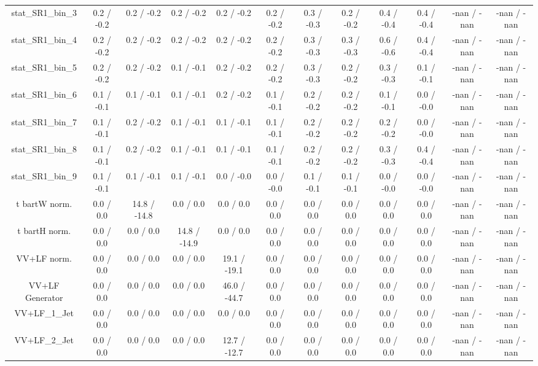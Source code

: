 \begin{table}[htbp]
\begin{center}
\begin{tabular}{|c|c|c|c|c|c|c|c|c|c|c|c|}
 stat_SR1_bin_3 & 0.2 / -0.2 & 0.2 / -0.2 & 0.2 / -0.2 & 0.2 / -0.2 & 0.2 / -0.2 & 0.3 / -0.3 & 0.2 / -0.2 & 0.4 / -0.4 & 0.4 / -0.4 & -nan / -nan & -nan / -nan \\ 
 stat_SR1_bin_4 & 0.2 / -0.2 & 0.2 / -0.2 & 0.2 / -0.2 & 0.2 / -0.2 & 0.2 / -0.2 & 0.3 / -0.3 & 0.3 / -0.3 & 0.6 / -0.6 & 0.4 / -0.4 & -nan / -nan & -nan / -nan \\ 
 stat_SR1_bin_5 & 0.2 / -0.2 & 0.2 / -0.2 & 0.1 / -0.1 & 0.2 / -0.2 & 0.2 / -0.2 & 0.3 / -0.3 & 0.2 / -0.2 & 0.3 / -0.3 & 0.1 / -0.1 & -nan / -nan & -nan / -nan \\ 
 stat_SR1_bin_6 & 0.1 / -0.1 & 0.1 / -0.1 & 0.1 / -0.1 & 0.2 / -0.2 & 0.1 / -0.1 & 0.2 / -0.2 & 0.2 / -0.2 & 0.1 / -0.1 & 0.0 / -0.0 & -nan / -nan & -nan / -nan \\ 
 stat_SR1_bin_7 & 0.1 / -0.1 & 0.2 / -0.2 & 0.1 / -0.1 & 0.1 / -0.1 & 0.1 / -0.1 & 0.2 / -0.2 & 0.2 / -0.2 & 0.2 / -0.2 & 0.0 / -0.0 & -nan / -nan & -nan / -nan \\ 
 stat_SR1_bin_8 & 0.1 / -0.1 & 0.2 / -0.2 & 0.1 / -0.1 & 0.1 / -0.1 & 0.1 / -0.1 & 0.2 / -0.2 & 0.2 / -0.2 & 0.3 / -0.3 & 0.4 / -0.4 & -nan / -nan & -nan / -nan \\ 
 stat_SR1_bin_9 & 0.1 / -0.1 & 0.1 / -0.1 & 0.1 / -0.1 & 0.0 / -0.0 & 0.0 / -0.0 & 0.1 / -0.1 & 0.1 / -0.1 & 0.0 / -0.0 & 0.0 / -0.0 & -nan / -nan & -nan / -nan \\ 
  t bar{t}W norm. & 0.0 / 0.0 & 14.8 / -14.8 & 0.0 / 0.0 & 0.0 / 0.0 & 0.0 / 0.0 & 0.0 / 0.0 & 0.0 / 0.0 & 0.0 / 0.0 & 0.0 / 0.0 & -nan / -nan & -nan / -nan \\ 
  t bar{t}H norm. & 0.0 / 0.0 & 0.0 / 0.0 & 14.8 / -14.9 & 0.0 / 0.0 & 0.0 / 0.0 & 0.0 / 0.0 & 0.0 / 0.0 & 0.0 / 0.0 & 0.0 / 0.0 & -nan / -nan & -nan / -nan \\ 
  VV+LF norm. & 0.0 / 0.0 & 0.0 / 0.0 & 0.0 / 0.0 & 19.1 / -19.1 & 0.0 / 0.0 & 0.0 / 0.0 & 0.0 / 0.0 & 0.0 / 0.0 & 0.0 / 0.0 & -nan / -nan & -nan / -nan \\ 
  VV+LF Generator & 0.0 / 0.0 & 0.0 / 0.0 & 0.0 / 0.0 & 46.0 / -44.7 & 0.0 / 0.0 & 0.0 / 0.0 & 0.0 / 0.0 & 0.0 / 0.0 & 0.0 / 0.0 & -nan / -nan & -nan / -nan \\ 
  VV+LF_1_Jet & 0.0 / 0.0 & 0.0 / 0.0 & 0.0 / 0.0 & 0.0 / 0.0 & 0.0 / 0.0 & 0.0 / 0.0 & 0.0 / 0.0 & 0.0 / 0.0 & 0.0 / 0.0 & -nan / -nan & -nan / -nan \\ 
  VV+LF_2_Jet & 0.0 / 0.0 & 0.0 / 0.0 & 0.0 / 0.0 & 12.7 / -12.7 & 0.0 / 0.0 & 0.0 / 0.0 & 0.0 / 0.0 & 0.0 / 0.0 & 0.0 / 0.0 & -nan / -nan & -nan / -nan \\ 

\end{tabular}
\end{center}
\end{table}
